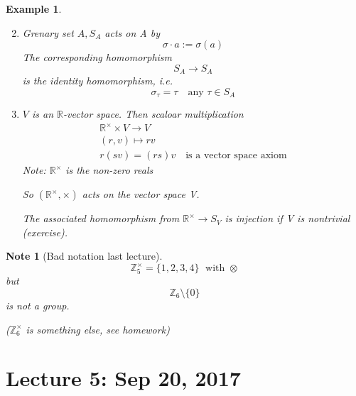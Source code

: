\documentclass[11pt, oneside]{book}
\theoremstyle{break}
\newtheorem*{note}{Note}
\newtheorem{eg}{Example}[section]
\newcommand{\bb}[1]{\mathbb{#1}}			%
\begin{document}
\begin{eg}
    \begin{enumerate}
        \setcounter{enumi}{1}
        \item Grenary set $A, S_A$ acts on A by
            \begin{equation}
                \sigma \cdot a := \sigma(a)
            \end{equation}
            The corresponding homomorphism
            \begin{equation}
                S_A \to S_A
            \end{equation}
            is the identity homomorphism, i.e.
            \begin{equation}
                \sigma_\tau = \tau \quad \text{any } \tau \in S_A
            \end{equation}

        \item $V$ is an $\bb{R}$-vector space. Then scaloar multiplication
            \begin{gather*}
                \bb{R}^\times \times V \to V \\
                (r, v) \mapsto rv \\
                r(sv) = (rs) v \quad \text{is a vector space axiom}
            \end{gather*}
            Note: $\bb{R}^\times$ is the non-zero reals

            So $(\bb{R}^\times, \times)$ acts on the vector space V.

            The associated homomorphism from $\bb{R}^\times \to S_V$ is injection if V is nontrivial (exercise).
    \end{enumerate}
\end{eg}

\begin{note}[Bad notation last lecture]
    \begin{equation}
        \bb{Z}_5^\times = \{1, 2, 3, 4\} \; \text{ with } \otimes
    \end{equation}
    but
    \begin{equation}
        \bb{Z}_6 \setminus \{0\}
    \end{equation}
    is not a group.

    ($\bb{Z}_6^\times$ is something else, see homework)
\end{note}

\chapter{Lecture 5: Sep 20, 2017}\label{chp:lec5}
\end{document}
